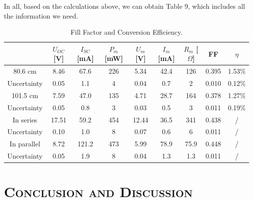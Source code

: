 \documentclass[a4paper,12pt]{article}
\begin{document}
In all, based on the calculations above, we can obtain Table 9, which includes all the information we need.

\begin{table}[H]
\begin{center}
\begin{tabular}{|c|c|c|c|c|c|c|c|c|}
\hline
 & $U_{OC}$ {[}V{]} & $I_{SC}$ {[}mA{]} & $P_m$ {[}mW{]} & $U_m$ {[}V{]} & $I_m$ {[}mA{]} & $R_m$ {[}$\Omega${]} & FF & $\eta$ \\ \hline
80.6 cm & 8.46 & 67.6 & 226 & 5.34 & 42.4 & 126 & 0.395 & 1.53\% \\ \hline
Uncertainty & 0.05 & 1.1 & 4 & 0.04 & 0.7 & 2 & 0.010 & 0.12\% \\ \hline
101.5 cm & 7.59 & 47.0 & 135 & 4.71 & 28.7 & 164 & 0.378 & 1.27\% \\ \hline
Uncertainty & 0.05 & 0.8 & 3 & 0.03 & 0.5 & 3 & 0.011 & 0.19\% \\ \hline
In series & 17.51 & 59.2 & 454 & 12.44 & 36.5 & 341 & 0.438 & / \\ \hline
Uncertainty & 0.10 & 1.0 & 8 & 0.07 & 0.6 & 6 & 0.011 & / \\ \hline
In parallel & 8.72 & 121.2 & 473 & 5.99 & 78.9 & 75.9 & 0.448 & / \\ \hline
Uncertainty & 0.05 & 1.9 & 8 & 0.04 & 1.3 & 1.3 & 0.011 & / \\ \hline
\end{tabular}
\caption{Fill Factor and Conversion Efficiency.}
\end{center}
\end{table}


\section{\textsc{Conclusion and Discussion}}
\end{document}
